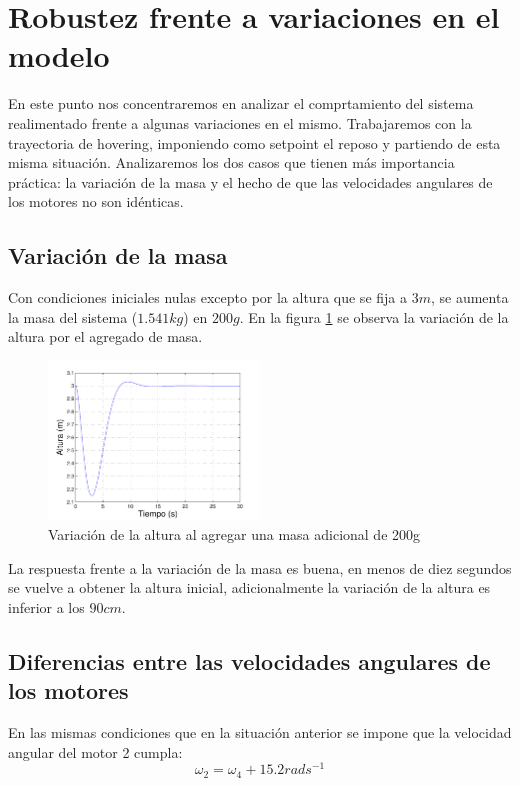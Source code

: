 \documentclass[main]{subfiles}
\begin{document}
\section{Robustez frente a variaciones en el modelo}

En este punto nos concentraremos en analizar el comprtamiento del sistema realimentado frente a algunas variaciones en el mismo. Trabajaremos con la trayectoria de hovering, imponiendo como setpoint el reposo y partiendo de esta misma situaci\'on. Analizaremos los dos casos que tienen m\'as importancia pr\'actica: la variaci\'on de la masa y el hecho de que las velocidades angulares de los motores no son id\'enticas.\\ 
\subsection*{Variaci\'on de la masa}
Con condiciones iniciales nulas excepto por la altura que se fija a $3m$, se aumenta la masa del sistema ($1.541kg$) en $200 g$. En la figura \ref{fig:masa} se observa la variaci\'on de la altura por el agregado de masa.


\begin{figure}
  \centering
	\includegraphics[width=0.5\textwidth]{./pics_test_control/robustez/masa.pdf}
  \caption{Variaci\'on de la altura al agregar una masa adicional de 200g}
  \label{fig:masa}
\end{figure}

La respuesta frente a la variaci\'on de la masa es buena, en menos de diez segundos se vuelve a obtener la altura inicial, adicionalmente la variaci\'on de la altura es inferior a los $90 cm$.  \\

\subsection*{Diferencias entre las velocidades angulares de los motores}

En las mismas condiciones que en la situaci\'on anterior se impone que la velocidad angular del motor 2 cumpla: 
\begin{equation}
\omega_2 = \omega_4 + 15.2rad s^{-1}
\end{equation}
\end{document}
